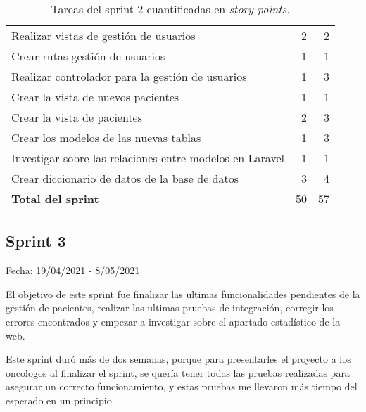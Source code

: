 \begin{table}[H]
\begin{tabularx}{\linewidth}{X r r}
        Realizar vistas de gestión de usuarios & 2 & 2 \\
        Crear rutas gestión de usuarios & 1 & 1 \\
        Realizar controlador para la gestión de usuarios & 1 & 3 \\
        Crear la vista de nuevos pacientes & 1 & 1 \\
        Crear la vista de pacientes & 2 & 3 \\
        Crear los modelos de las nuevas tablas & 1 & 3 \\
        Investigar sobre las relaciones entre modelos en Laravel & 1 & 1 \\
        Crear diccionario de datos de la base de datos & 3 & 4 \\
        \midrule
	    \textbf{Total del sprint} & 50 & 57 \\
	 	\bottomrule
	 \end{tabularx}
	 \caption{Tareas del sprint 2 cuantificadas en \textit{story points}.}
\end{table}

\subsection{Sprint 3}

Fecha: 19/04/2021 - 8/05/2021

El objetivo de este sprint fue finalizar las ultimas funcionalidades pendientes de la gestión de pacientes, realizar las ultimas pruebas de integración, corregir los errores encontrados y empezar a investigar sobre el apartado estadístico de la web. 

Este sprint duró más de dos semanas, porque para presentarles el proyecto a los oncologos al finalizar el sprint, se quería tener todas las pruebas realizadas para asegurar un correcto funcionamiento, y estas pruebas me llevaron más tiempo del esperado en un principio.



